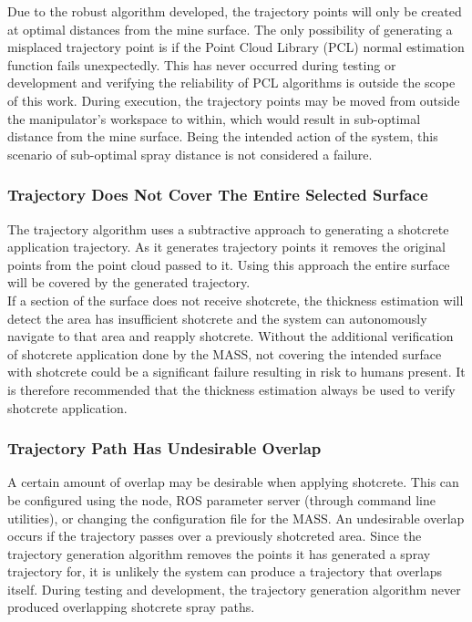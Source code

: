 Due to the robust algorithm developed, the trajectory points will only be created at optimal distances from the mine surface. The only possibility of generating a misplaced trajectory point is if the Point Cloud Library (PCL) normal estimation function fails unexpectedly. This has never occurred during testing or development and verifying the reliability of PCL algorithms is outside the scope of this work. During execution, the trajectory points may be moved from outside the manipulator's workspace to within, which would result in sub-optimal distance from the mine surface. Being the intended action of the system, this scenario of sub-optimal spray distance is not considered a failure.\\

\subsubsection{Trajectory Does Not Cover The Entire Selected Surface}

The trajectory algorithm uses a subtractive approach to generating a shotcrete application trajectory. As it generates trajectory points it removes the original points from the point cloud passed to it. Using this approach the entire surface will be covered by the generated trajectory.\\

If a section of the surface does not receive shotcrete, the thickness estimation will detect the area has insufficient shotcrete and the system can autonomously navigate to that area and reapply shotcrete. Without the additional verification of shotcrete application done by the MASS, not covering the intended surface with shotcrete could be a significant failure resulting in risk to humans present. It is therefore recommended that the thickness estimation always be used to verify shotcrete application.\\

\subsubsection{Trajectory Path Has Undesirable Overlap}

A certain amount of overlap may be desirable when applying shotcrete. This can be configured using the  node, ROS parameter server (through command line utilities), or changing the configuration file for the MASS. An undesirable overlap occurs if the trajectory passes over a previously shotcreted area. Since the trajectory generation algorithm removes the points it has generated a spray trajectory for, it is unlikely the system can produce a trajectory that overlaps itself. During testing and development, the trajectory generation algorithm never produced overlapping shotcrete spray paths.\\

